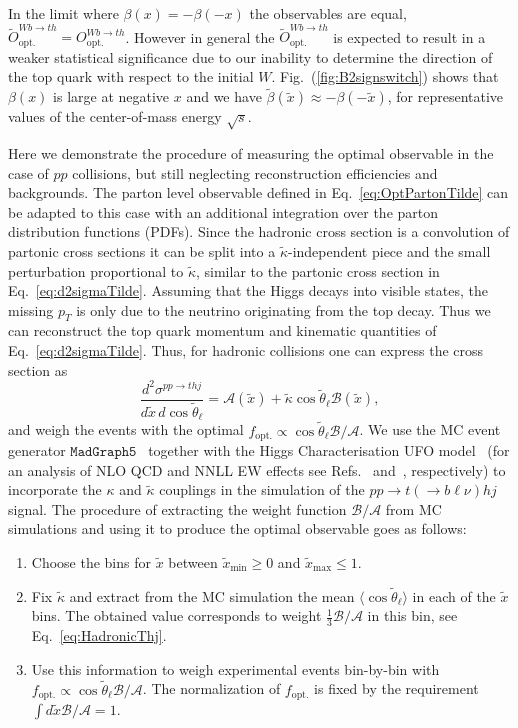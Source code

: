 \documentclass[11pt,a4paper]{article}
\newcommand{\mc}[1]{\mathcal{#1}}
\newcommand{\mrm}[1]{\mathrm{#1}}
\begin{document}
In the limit where $\beta(x) = - \beta(-x)$ the observables are equal,
$\tilde O_\mathrm{opt.}^{Wb \to th} = O_\mathrm{opt.}^{Wb \to th}$. However in general the $\tilde O_\mathrm{opt.}^{Wb \to th}$ is expected to result in a weaker statistical significance due to our inability to determine the direction of the top quark with respect to the initial $W$. Fig.~(\ref{fig:B2signswitch}) shows that  $\beta(x)$ is large at negative $x$ and we have $\tilde\beta(\tilde x) \approx -\beta(-\tilde x)$, for representative values of the center-of-mass energy $\sqrt{s}$.

Here we demonstrate the procedure of measuring the optimal observable in the case of $pp$ collisions, but still neglecting reconstruction efficiencies and backgrounds. The parton level observable
defined in Eq.~\eqref{eq:OptPartonTilde} can be adapted to this case with an
additional integration over the parton distribution functions
(PDFs). Since the hadronic cross section is a convolution of partonic
cross sections it can be split into a $\tilde \kappa$-independent piece and the
small perturbation proportional to $\tilde \kappa$, similar to the partonic cross section in Eq.~\eqref{eq:d2sigmaTilde}. Assuming that the
Higgs decays into visible states, the missing $p_T$ is only due to the
neutrino originating from the top decay. Thus we can reconstruct the top quark momentum and
kinematic quantities of
Eq.~\eqref{eq:d2sigmaTilde}. Thus, for hadronic collisions one can
express the cross section as
\begin{equation}
\label{eq:HadronicThj}  
\frac{d^2\sigma^{pp\to thj }}{d\tilde x\,d\cos \tilde\theta_\ell} = \mc{A}(\tilde x) + \tilde \kappa \cos\tilde \theta_\ell \mc{B} (\tilde x) ,
\end{equation}
and weigh the events with the optimal
$f_\mrm{opt.}  \propto \cos\tilde\theta_\ell \mc{B}/ \mc{A}$. We use the MC event generator
$\texttt{MadGraph5}$~\cite{Alwall:2014hca,1212.3460} together with the Higgs
Characterisation UFO model~\cite{Degrande:2011ua, Artoisenet:2013puc} (for an analysis of NLO QCD and NNLL EW effects see  Refs.~\cite{1407.5089, 1504.00611} and~\cite{1907.04343}, respectively) to incorporate the
$\kappa$ and $\tilde \kappa$ couplings in the simulation of the
$p p \to t (\to b \ell \nu) h j$ signal. The procedure of extracting the weight function $\mc{B}/\mc{A}$ from MC
simulations and using it to produce the optimal observable goes as
follows:
\begin{enumerate}
	\item Choose the bins for $\tilde{x}$ between $\tilde x_\mrm{min} \ge 0$ and $\tilde x_\mrm{max} \le 1$.
	\item Fix $\tilde{\kappa}$ and extract from the MC simulation the mean $\langle\cos\tilde{\theta}_\ell\rangle$ in each of the $\tilde x$ bins. The obtained value corresponds to weight $\frac{1}{3}\mc{B}/\mc{A}$ in this bin, see Eq.~\eqref{eq:HadronicThj}.
	\item Use this information to weigh experimental events bin-by-bin with $f_\mrm{opt.} \propto \cos\tilde\theta_\ell \mc{B}/ \mc{A}$. The normalization of $f_\mrm{opt.}$ is fixed by the requirement $\int d\tilde x \mc{B}/ \mc{A} = 1$.         
\end{enumerate}
\end{document}
